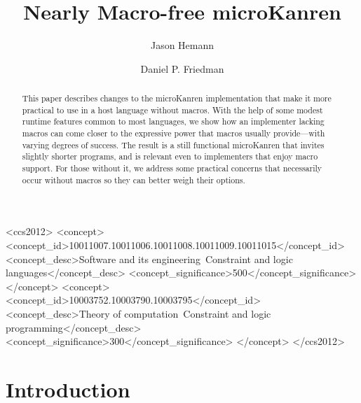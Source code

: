 \documentclass[sigplan,draft,balance,pbalance,natbib=false]{acmart}
\begin{document}
\title{Nearly Macro-free microKanren}

\author{Jason Hemann}
\author{Daniel P. Friedman}

\renewcommand{\shortauthors}{Hemann et al.}

\begin{abstract}

  This paper describes changes to the microKanren implementation that
  make it more practical to use in a host language without macros.
  With the help of some modest runtime features common to most
  languages, we show how an implementer lacking macros can come closer
  to the expressive power that macros usually provide---with varying
  degrees of success. The result is a still functional microKanren that
  invites slightly shorter programs, and is relevant even to
  implementers that enjoy macro support. For those without it, we
  address some practical concerns that necessarily occur without
  macros so they can better weigh their options.

\end{abstract}

\begin{CCSXML}
<ccs2012>
   <concept>
       <concept_id>10011007.10011006.10011008.10011009.10011015</concept_id>
       <concept_desc>Software and its engineering~Constraint and logic languages</concept_desc>
       <concept_significance>500</concept_significance>
   </concept>
   <concept>
       <concept_id>10003752.10003790.10003795</concept_id>
       <concept_desc>Theory of computation~Constraint and logic programming</concept_desc>
       <concept_significance>300</concept_significance>
   </concept>
 </ccs2012>
\end{CCSXML}



\maketitle

\section{Introduction}
\end{document}
